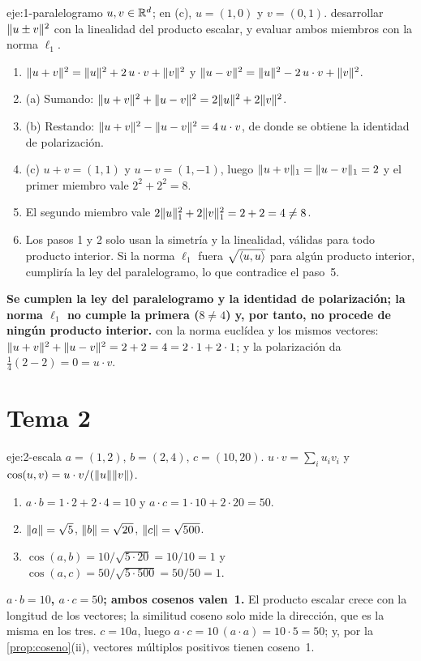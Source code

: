 \begin{solucion}{eje:1-paralelogramo}
\datos $u,v\in\mathbb{R}^{d}$; en (c), $u=(1,0)$ y $v=(0,1)$.
\planteamiento desarrollar $\lVert u\pm v\rVert^{2}$ con la linealidad del producto escalar, y evaluar ambos miembros con la norma $\ell_1$.
\pasos
\begin{enumerate}[label=\arabic*.]
  \item $\lVert u+v\rVert^{2}=\lVert u\rVert^{2}+2\,u\cdot v+\lVert v\rVert^{2}$ y $\lVert u-v\rVert^{2}=\lVert u\rVert^{2}-2\,u\cdot v+\lVert v\rVert^{2}$.
  \item (a) Sumando: $\lVert u+v\rVert^{2}+\lVert u-v\rVert^{2}=2\lVert u\rVert^{2}+2\lVert v\rVert^{2}$.
  \item (b) Restando: $\lVert u+v\rVert^{2}-\lVert u-v\rVert^{2}=4\,u\cdot v$, de donde se obtiene la identidad de polarización.
  \item (c) $u+v=(1,1)$ y $u-v=(1,-1)$, luego $\lVert u+v\rVert_1=\lVert u-v\rVert_1=2$ y el primer miembro vale $2^{2}+2^{2}=8$.
  \item El segundo miembro vale $2\lVert u\rVert_1^{2}+2\lVert v\rVert_1^{2}=2+2=4\neq 8$.
  \item Los pasos 1 y 2 solo usan la simetría y la linealidad, válidas para todo producto interior. Si la norma $\ell_1$ fuera $\sqrt{\langle u,u\rangle}$ para algún producto interior, cumpliría la ley del paralelogramo, lo que contradice el paso~5.
\end{enumerate}
\resultado \textbf{Se cumplen la ley del paralelogramo y la identidad de polarización; la norma $\ell_1$ no cumple la primera ($8\neq 4$) y, por tanto, no procede de ningún producto interior.}
\comprobacion con la norma euclídea y los mismos vectores: $\lVert u+v\rVert^{2}+\lVert u-v\rVert^{2}=2+2=4=2\cdot 1+2\cdot 1$; y la polarización da $\tfrac14(2-2)=0=u\cdot v$.
\end{solucion}

\section{Tema 2}

\begin{solucion}{eje:2-escala}
\datos $a=(1,2)$, $b=(2,4)$, $c=(10,20)$.
\planteamiento $u\cdot v=\sum_iu_iv_i$ y $\cos(u,v)=u\cdot v/(\lVert u\rVert\lVert v\rVert)$.
\pasos
\begin{enumerate}[label=\arabic*.]
  \item $a\cdot b=1\cdot 2+2\cdot 4=10$ y $a\cdot c=1\cdot 10+2\cdot 20=50$.
  \item $\lVert a\rVert=\sqrt5$, $\lVert b\rVert=\sqrt{20}$, $\lVert c\rVert=\sqrt{500}$.
  \item $\cos(a,b)=10/\sqrt{5\cdot 20}=10/10=1$ y $\cos(a,c)=50/\sqrt{5\cdot 500}=50/50=1$.
\end{enumerate}
\resultado \textbf{$a\cdot b=10$, $a\cdot c=50$; ambos cosenos valen~1.} El producto escalar crece con la longitud de los vectores; la similitud coseno solo mide la dirección, que es la misma en los tres.
\comprobacion $c=10a$, luego $a\cdot c=10\,(a\cdot a)=10\cdot 5=50$; y, por la \cref{prop:coseno}(ii), vectores múltiplos positivos tienen coseno~1.
\end{solucion}

